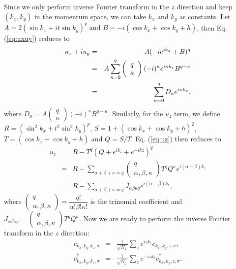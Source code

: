 \documentclass[twocolumn,prb,aps,epsfig,superscriptaddress,showpacs]{revtex4-1}
\begin{document}
Since we only perform inverse Fourier transform in the $z$ direction and keep $%
(k_{x},k_{y})$ in the momentum space, we can take $k_{x}$ and $k_{y}$ as
constants. Let $A=2(\sin k_{x}+it\sin k_{y})^{p}\;%
\text{and }B=-i(\cos k_{x}+\cos k_{y}+h)$, then Eq. (\ref{eq:uxuy}) reduces
to 
\begin{eqnarray}
u_{x}+iu_{y} &=&A(-ie^{ik_{z}}+B)^{q}  \notag \\
&=&A\sum_{\kappa =0}^{q}\left( 
\begin{array}{c}
q \\ 
\kappa 
\end{array}%
\right) (-i)^{\kappa }e^{i\kappa k_{z}}B^{q-\kappa }  \label{eq:uxuy1} \\
&=&\sum_{\kappa =0}^{q}D_{\kappa }e^{i\kappa k_{z}},  \notag
\end{eqnarray}%
where $D_{\kappa }=A\left( 
\begin{array}{c}
q \\ 
\kappa 
\end{array}%
\right) (-i)^{\kappa }B^{q-\kappa }$. Similarly, for the $u_{z}$ term, we define $%
R=(\sin ^{2}k_{x}+t^{2}\sin ^{2}k_{y})^{p}$, $S=1+(\cos k_{x}+\cos
k_{y}+h)^{2}$, $T=(\cos k_{x}+\cos k_{y}+h)$ and $Q=S/T$. Eq. (\ref{eq:uz})
then reduces to 
\begin{eqnarray*}
u_{z} &=&R-T^{q}(Q+e^{ik_{z}}+e^{-ikz})^{q} \\
&=&R-\sum_{\alpha +\beta +\kappa =q}\left( 
\begin{array}{c}
q \\ 
\alpha ,\beta ,\kappa 
\end{array}%
\right) T^{q}Q^{\kappa }e^{i(\alpha -\beta )k_{z}} \\
&=&R-\sum_{\alpha +\beta +\kappa =q}J_{\alpha \beta \kappa q}e^{i(\alpha
-\beta )k_{z}},
\end{eqnarray*}%
where $\left( 
\begin{array}{c}
q \\ 
\alpha ,\beta ,\kappa 
\end{array}%
\right) =\dfrac{q!}{\alpha !\beta !\kappa !}$ is the trinomial coefficient
and $J_{\alpha \beta \kappa q}=\left( 
\begin{array}{c}
q \\ 
\alpha ,\beta ,\kappa 
\end{array}%
\right) T^{q}Q^{\kappa }$. Now we are ready to perform the inverse Fourier
transform in the $z$ direction: 
\begin{eqnarray*}
c_{k_{x},k_{y},k_{z},\sigma } &=&\frac{1}{\sqrt{N_{z}}}%
\sum_{z}e^{izk_{z}}c_{k_{x},k_{y},z,\sigma }, \\
c_{k_{x},k_{y},k_{z},\sigma }^{\dagger } &=&\frac{1}{\sqrt{N_{z}}}%
\sum_{z}e^{-izk_{z}}c_{k_{x},k_{y},z,\sigma }^{\dagger }.
\end{eqnarray*}%
\end{document}
